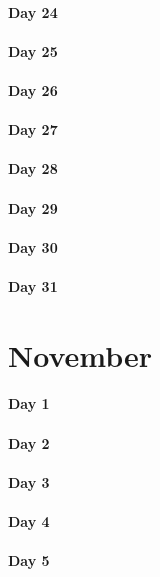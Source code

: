 \documentclass[UTF8,a4paper,8pt]{ctexart}
\begin{document}
 	 \paragraph{Day 24      \quad     }
 	 \paragraph{Day 25      \quad     }
 	 \paragraph{Day 26      \quad     }
 	 \paragraph{Day 27      \quad     }
 	 \paragraph{Day 28      \quad     }
 	 \paragraph{Day 29      \quad     }   
 	 \paragraph{Day 30      \quad     }
 	 \paragraph{Day 31      \quad     }
\section{November}
 	 \paragraph{Day 1       \quad     }
 	 \paragraph{Day 2       \quad     }
 	 \paragraph{Day 3       \quad     }
 	 \paragraph{Day 4       \quad     }
 	 \paragraph{Day 5       \quad     }
\end{document}
